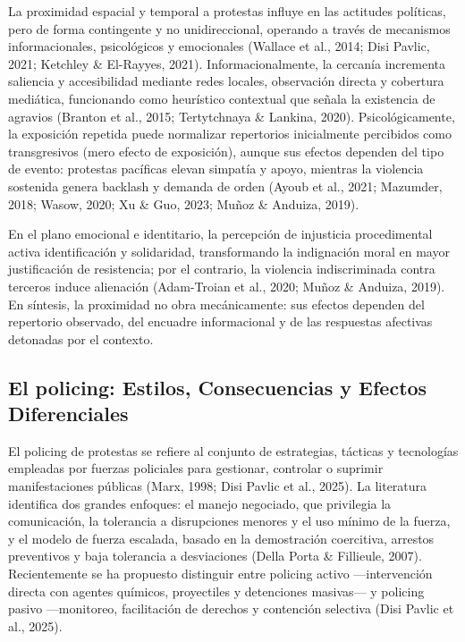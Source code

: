 \documentclass[
  13pt,
]{article}
\begin{document}
La proximidad espacial y temporal a protestas influye en las actitudes
políticas, pero de forma contingente y no unidireccional, operando a
través de mecanismos informacionales, psicológicos y emocionales
(Wallace et al., 2014; Disi Pavlic, 2021; Ketchley \& El-Rayyes, 2021).
Informacionalmente, la cercanía incrementa saliencia y accesibilidad
mediante redes locales, observación directa y cobertura mediática,
funcionando como heurístico contextual que señala la existencia de
agravios (Branton et al., 2015; Tertytchnaya \& Lankina, 2020).
Psicológicamente, la exposición repetida puede normalizar repertorios
inicialmente percibidos como transgresivos (mero efecto de exposición),
aunque sus efectos dependen del tipo de evento: protestas pacíficas
elevan simpatía y apoyo, mientras la violencia sostenida genera backlash
y demanda de orden (Ayoub et al., 2021; Mazumder, 2018; Wasow, 2020; Xu
\& Guo, 2023; Muñoz \& Anduiza, 2019).

En el plano emocional e identitario, la percepción de injusticia
procedimental activa identificación y solidaridad, transformando la
indignación moral en mayor justificación de resistencia; por el
contrario, la violencia indiscriminada contra terceros induce alienación
(Adam-Troian et al., 2020; Muñoz \& Anduiza, 2019). En síntesis, la
proximidad no obra mecánicamente: sus efectos dependen del repertorio
observado, del encuadre informacional y de las respuestas afectivas
detonadas por el contexto.

\subsection{El policing: Estilos, Consecuencias y Efectos
Diferenciales}\label{el-policing-estilos-consecuencias-y-efectos-diferenciales}

El policing de protestas se refiere al conjunto de estrategias, tácticas
y tecnologías empleadas por fuerzas policiales para gestionar, controlar
o suprimir manifestaciones públicas (Marx, 1998; Disi Pavlic et al.,
2025). La literatura identifica dos grandes enfoques: el manejo
negociado, que privilegia la comunicación, la tolerancia a disrupciones
menores y el uso mínimo de la fuerza, y el modelo de fuerza escalada,
basado en la demostración coercitiva, arrestos preventivos y baja
tolerancia a desviaciones (Della Porta \& Fillieule, 2007).
Recientemente se ha propuesto distinguir entre policing activo
---intervención directa con agentes químicos, proyectiles y detenciones
masivas--- y policing pasivo ---monitoreo, facilitación de derechos y
contención selectiva (Disi Pavlic et al., 2025).
\end{document}
